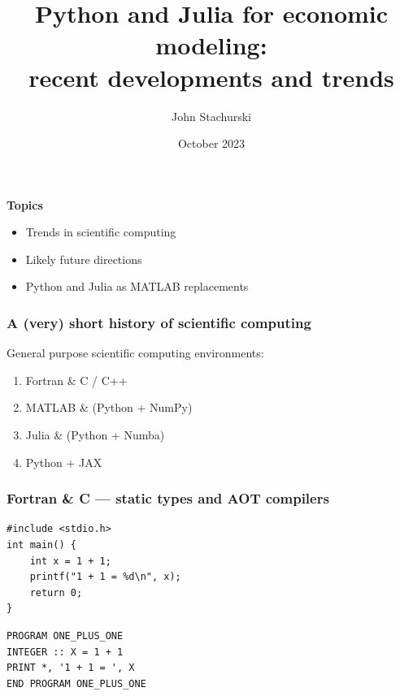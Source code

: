 \documentclass[
    xcolor={svgnames,dvipsnames},
    hyperref={colorlinks, citecolor=DeepPink4, linkcolor=DarkRed, urlcolor=DarkBlue}
    ]{beamer}  %
\title{Python and Julia for economic modeling: \\ recent developments and trends}
\author{John Stachurski}
\date{October 2023}
\newcommand{\1}{\mathbbm 1}
\begin{document}
\begin{frame}
  \titlepage
\end{frame}







\begin{frame}


    \textbf{Topics}

    \begin{itemize}
        \item Trends in scientific computing
        \vspace{0.5em}
        \item Likely future directions
        \vspace{0.5em}
        \item Python and Julia as MATLAB replacements
    \end{itemize}

\end{frame}



\begin{frame}
    \frametitle{A (very) short history of scientific computing}


    General purpose scientific computing environments:

        \vspace{0.5em}
        \vspace{0.5em}
    \begin{enumerate}
        \item Fortran \& C / C++ 
        \vspace{0.5em}
        \vspace{0.5em}
        \item MATLAB \& (Python + NumPy)
        \vspace{0.5em}
        \vspace{0.5em}
        \item Julia \& (Python + Numba) 
        \vspace{0.5em}
        \vspace{0.5em}
        \item Python + JAX 
    \end{enumerate}

\end{frame}



\begin{frame}[fragile]
    \frametitle{Fortran \& C --- static types and AOT compilers}

    {\small
    \begin{verbatim}
#include <stdio.h>
int main() {
    int x = 1 + 1;
    printf("1 + 1 = %d\n", x);
    return 0;
}   
    \end{verbatim}
    }


    {\small
    \begin{verbatim}
PROGRAM ONE_PLUS_ONE  
INTEGER :: X = 1 + 1 
PRINT *, '1 + 1 = ', X
END PROGRAM ONE_PLUS_ONE 
    \end{verbatim}
    }

\end{frame}
\end{document}
